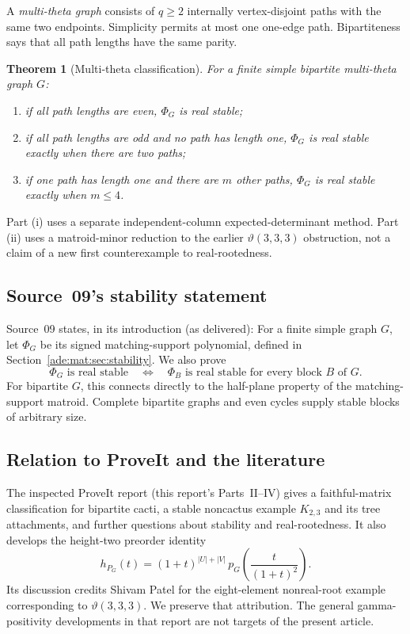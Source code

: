 \documentclass[11pt]{article}
\numberwithin{equation}{section}
\newtheorem{theorem}{Theorem}[section]
\theoremstyle{definition}
\begin{document}
A \emph{multi-theta graph} consists of $q\ge2$ internally vertex-disjoint
paths with the same two endpoints.  Simplicity permits at most one
one-edge path.  Bipartiteness says that all path lengths have the same
parity.

\begin{theorem}[Multi-theta classification]
\label{ade:thm:introtheta}
For a finite simple bipartite multi-theta graph $G$:
\begin{enumerate}[label=(\roman*)]
 \item if all path lengths are even, $\Phi_G$ is real stable;
 \item if all path lengths are odd and no path has length one,
       $\Phi_G$ is real stable exactly when there are two paths;
 \item if one path has length one and there are $m$ other paths,
       $\Phi_G$ is real stable exactly when $m\le4$.
\end{enumerate}
\end{theorem}

Part (i) uses a separate independent-column expected-determinant method.
Part (ii) uses a matroid-minor reduction to the earlier
$\vartheta(3,3,3)$ obstruction, not a claim of a new first counterexample to
real-rootedness.

\subsection{Source~09's stability statement}
\label{ade:sec:mat:intro}
Source~09 states, in its introduction (as delivered):
For a finite simple graph $G$, let $\Phi_G$ be its signed matching-support
polynomial, defined in Section~\ref{ade:mat:sec:stability}. We also prove
\begin{equation}
\boxed{\quad \Phi_G\text{ is real stable}
 \quad\Longleftrightarrow\quad
 \Phi_B\text{ is real stable for every block }B\text{ of }G.\quad}
\label{ade:mat:eq:intro-block}
\end{equation}
For bipartite $G$, this connects directly to the half-plane property of the
matching-support matroid. Complete bipartite graphs and even cycles supply
stable blocks of arbitrary size.

\subsection{Relation to ProveIt and the literature}
\label{ade:sec:prior}

The inspected ProveIt report (this report's Parts~II--IV) gives a faithful-matrix
classification for bipartite cacti, a stable noncactus example $K_{2,3}$
and its tree attachments, and further questions about stability and
real-rootedness.  It also develops the height-two preorder identity
\begin{equation}
 h_{P_G}(t)=(1+t)^{|U|+|V|}\,
             p_G\!\left(\frac{t}{(1+t)^2}\right).
 \label{ade:eq:preorderimport}
\end{equation}
Its discussion credits Shivam Patel for the eight-element nonreal-root
example corresponding to $\vartheta(3,3,3)$.  We preserve that attribution.
The general gamma-positivity developments in that report are not targets
of the present article.
\end{document}
